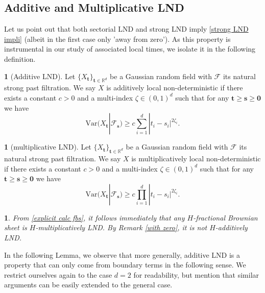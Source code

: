 \documentclass[11pt,oneside,english,reqno]{amsart}
\numberwithin{equation}{section}
\numberwithin{figure}{section}
\theoremstyle{plain}
\theoremstyle{definition}
\newtheorem{defn}[thm]{\protect\definitionname}
\theoremstyle{remark}
\theoremstyle{plain}
\theoremstyle{plain}
\theoremstyle{plain}
\theoremstyle{plain}
\newtheorem{example}[thm]{\protect\examplename}
\theoremstyle{plain}
\providecommand{\definitionname}{Definition}
\providecommand{\examplename}{Example}
\newcommand{\red}[1]{{\color{red} #1}}
\newcommand{\cF}{\mathcal{F}}
\newcommand{\RR}{\mathbb{R}}
\newcommand{\boo}{\mathbf{0}}
\newcommand{\bs}{\mathbf{s}}
\newcommand{\bt}{\mathbf{t}}
\begin{document}
\subsection{Additive and Multiplicative LND}
Let us point out that both sectorial LND and strong LND imply \eqref{strong LND impli} (albeit in the first case only 'away from zero'). As this property is instrumental in our study of associated local times, we isolate it in the following definition.

\begin{defn}[Additive LND]\label{def:additive LND}
    Let $\{X_\bt\}_{\bt\in \RR^d}$ be a Gaussian random field with $\mathcal{F}$ its natural strong past filtration. We say $X$ is additively local non-deterministic if there exists a constant $c>0$ and a multi-index $\zeta \in (0,1)^d$ such that for any $\bt\ge\bs\ge\mathbf{0}$ we have 
    \begin{equation}\label{eq:add LND}
        \mbox{Var}(X_{\bt}|\cF_\bs)\geq c \sum_{i=1}^d |t_i-s_i|^{2\zeta_i}. 
    \end{equation}
\end{defn}

\begin{defn}[multiplicative LND]\label{def:multiplicative LND}
         Let $\{X_\bt\}_{\bt\in \RR^d}$ be a Gaussian random field with $\mathcal{F}$ its natural strong past filtration. We say $X$ is multiplicatively local non-deterministic if there exists a constant $c>0$ and a multi-index $\zeta \in (0,1)^d$ such that for any $\bt\ge\bs\ge\mathbf{0}$ we have 
    \begin{equation*}
        \mbox{Var}(X_{\bt}|\cF_\bs)\geq c \prod_{i=1}^d |t_i-s_i|^{2\zeta_i}. 
    \end{equation*}
\end{defn}
\begin{example}
  From \eqref{explicit calc fbs}, it follows immediately that any $H$-fractional Brownian sheet is $H$-multiplicatively LND. By Remark \ref{with zero}, it is not $H$-additively LND.
\end{example}
\noindent In the following Lemma, we observe that more generally, additive LND is a property that can only come from boundary terms in the following sense. We restrict ourselves again to the case $d=2$ for readability, but mention that similar arguments can be easily extended to the general case.

\end{document}
